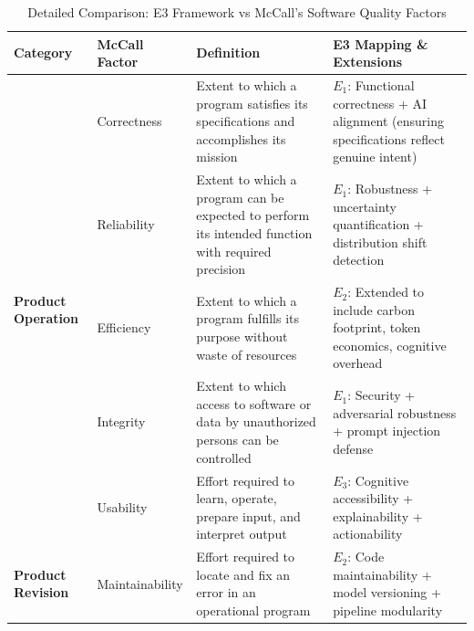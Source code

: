 
\begin{table}[t]
\centering
\caption{Detailed Comparison: E3 Framework vs McCall's Software Quality Factors}
\label{tab:mccall_comparison}
\small
\begin{tabularx}{\textwidth}{@{}l l X X@{}}
\toprule
\textbf{Category} & \textbf{McCall Factor} & \textbf{Definition} & \textbf{E3 Mapping \& Extensions} \\
\midrule

\multirow{5}{*}{\textbf{Product Operation}} & 
Correctness & 
Extent to which a program satisfies its specifications and accomplishes its mission &
\textbf{$E_1$}: Functional correctness + AI alignment (ensuring specifications reflect genuine intent) \\

\addlinespace

& Reliability & 
Extent to which a program can be expected to perform its intended function with required precision &
\textbf{$E_1$}: Robustness + uncertainty quantification + distribution shift detection \\

\addlinespace

& Efficiency & 
Extent to which a program fulfills its purpose without waste of resources &
\textbf{$E_2$}: Extended to include carbon footprint, token economics, cognitive overhead \\

\addlinespace

& Integrity & 
Extent to which access to software or data by unauthorized persons can be controlled &
\textbf{$E_1$}: Security + adversarial robustness + prompt injection defense \\

\addlinespace

& Usability & 
Effort required to learn, operate, prepare input, and interpret output &
\textbf{$E_3$}: Cognitive accessibility + explainability + actionability \\

\midrule

\multirow{3}{*}{\textbf{Product Revision}} & 
Maintainability & 
Effort required to locate and fix an error in an operational program &
\textbf{$E_2$}: Code maintainability + model versioning + pipeline modularity \\


\end{tabularx}
\end{table}

